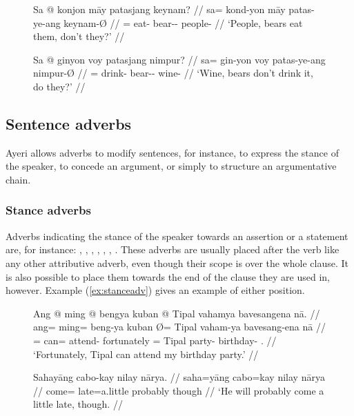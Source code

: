 \begin{figure}[h]
\pex
\a\label{ex:posexpect}\begingl
	\gla Sa @ konjon māy patasjang keynam? //
	\glb sa= kond-yon māy patas-ye-ang keynam-Ø //
	\glc \PatT{}= eat-\TplN{} \Aff{} bear-\Pl{}-\Aarg{} people-\Top{} //
	\glft `People, bears eat them, don't they?' //
\endgl

\a\label{ex:negexpect}\begingl
	\gla Sa @ ginyon voy patasjang nimpur? //
	\glb sa= gin-yon voy patas-ye-ang nimpur-Ø //
	\glc \PatT{}= drink-\TplN{} \Neg{} bear-\Pl{}-\Aarg{} wine-\Top{} //
	\glft `Wine, bears don't drink it, do they?' //
\endgl
\xe
\end{figure}


\subsection{Sentence adverbs}

Ayeri allows adverbs to modify sentences, for instance, to express the stance
of the speaker, to concede an argument, or simply to structure an argumentative
chain.

\subsubsection{Stance adverbs}

Adverbs indicating the stance of the speaker towards an assertion or a 
statement are, for instance:
, 
,
,
,
,
,
.
These adverbs are usually placed after the verb like any other attributive 
adverb, even though their scope is over the whole clause. It is also possible 
to place them towards the end of the clause they are used in, however. Example 
(\ref{ex:stanceadv}) gives an example of either position.

\begin{figure}[h]
\pex\label{ex:stanceadv}
\a\begingl
	\gla Ang @ ming @ bengya kuban {} @ Tipal vahamya bavesangena nā. //
	\glb ang= ming= beng-ya kuban Ø= Tipal vaham-ya bavesang-ena nā //
	\glc \AgtT{}= can= attend-\TsgM{} fortunately \Top{}= Tipal party-\Loc{} 
		birthday-\Gen{} \Fsg{}.\Gen{} //
	\glft `Fortunately, Tipal can attend my birthday party.' //
\endgl

\a\label{ex:naaryaadv}\begingl
	\gla Sahayāng cabo-kay nilay nārya. //
	\glb saha=yāng cabo=kay nilay nārya //
	\glc come=\TsgM{} late=a.little probably though //
	\glft `He will probably come a little late, though. //
\endgl
\xe
\end{figure}

